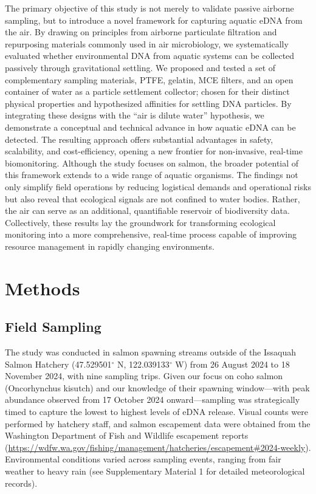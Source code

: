 \documentclass{article}
\begin{document}
The primary objective of this study is not merely to validate passive airborne sampling, but to introduce a novel framework for capturing aquatic eDNA from the air. By drawing on principles from airborne particulate filtration and repurposing materials commonly used in air microbiology, we systematically evaluated whether environmental DNA from aquatic systems can be collected passively through gravitational settling. We proposed and tested a set of complementary sampling materials, PTFE, gelatin, MCE filters, and an open container of water as a particle settlement collector; chosen for their distinct physical properties and hypothesized affinities for settling DNA particles. By integrating these designs with the “air is dilute water” hypothesis, we demonstrate a conceptual and technical advance in how aquatic eDNA can be detected. The resulting approach offers substantial advantages in safety, scalability, and cost-efficiency, opening a new frontier for non-invasive, real-time biomonitoring. Although the study focuses on salmon, the broader potential of this framework extends to a wide range of aquatic organisms. The findings not only simplify field operations by reducing logistical demands and operational risks but also reveal that ecological signals are not confined to water bodies. Rather, the air can serve as an additional, quantifiable reservoir of biodiversity data. Collectively, these results lay the groundwork for transforming ecological monitoring into a more comprehensive, real-time process capable of improving resource management in rapidly changing environments.

\section{Methods}

\subsection{Field Sampling}

The study was conducted in salmon spawning streams outside of the Issaquah Salmon Hatchery (47.529501$^\circ$ N, 122.039133$^\circ$ W) from 26 August 2024 to 18 November 2024, with nine sampling trips. Given our focus on coho salmon (Oncorhynchus kisutch) and our knowledge of their spawning window—with peak abundance observed from 17 October 2024 onward—sampling was strategically timed to capture the lowest to highest levels of eDNA release. Visual counts were performed by hatchery staff, and salmon escapement data were obtained from the Washington Department of Fish and Wildlife escapement reports (\href{https://wdfw.wa.gov/fishing/management/hatcheries/escapement#2024-weekly}{https://wdfw.wa.gov/fishing/management/hatcheries/escapement\#2024-weekly}). Environmental conditions varied across sampling events, ranging from fair weather to heavy rain (see Supplementary Material 1 for detailed meteorological records).
\end{document}
